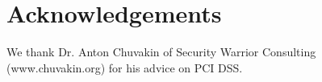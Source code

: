 \section*{Acknowledgements{\label{sec:acknowledgements}}}

We thank Dr. Anton Chuvakin of Security Warrior Consulting
(www.chuvakin.org) for his advice on PCI DSS.













